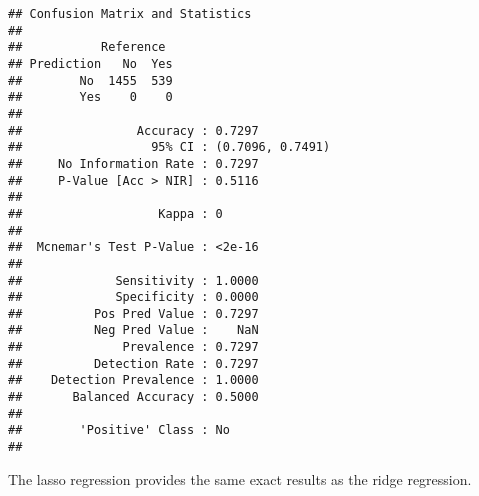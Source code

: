 \documentclass[
]{article}
\begin{document}
\begin{verbatim}
## Confusion Matrix and Statistics
## 
##           Reference
## Prediction   No  Yes
##        No  1455  539
##        Yes    0    0
##                                           
##                Accuracy : 0.7297          
##                  95% CI : (0.7096, 0.7491)
##     No Information Rate : 0.7297          
##     P-Value [Acc > NIR] : 0.5116          
##                                           
##                   Kappa : 0               
##                                           
##  Mcnemar's Test P-Value : <2e-16          
##                                           
##             Sensitivity : 1.0000          
##             Specificity : 0.0000          
##          Pos Pred Value : 0.7297          
##          Neg Pred Value :    NaN          
##              Prevalence : 0.7297          
##          Detection Rate : 0.7297          
##    Detection Prevalence : 1.0000          
##       Balanced Accuracy : 0.5000          
##                                           
##        'Positive' Class : No              
## 
\end{verbatim}

The lasso regression provides the same exact results as the ridge
regression.
\end{document}
